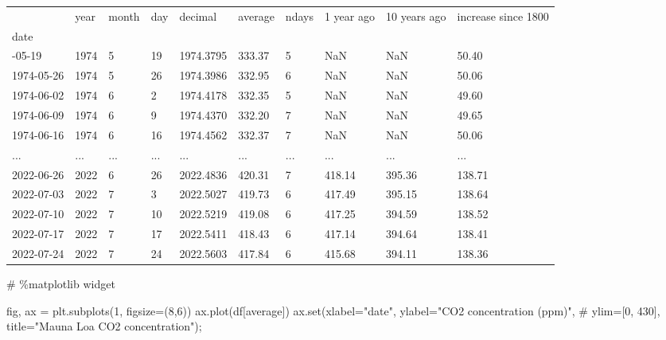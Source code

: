 \documentclass[
  letterpaper,
  DIV=11,
  numbers=noendperiod,
  oneside]{scrreprt}
\newenvironment{Shaded}{\begin{snugshade}}{\end{snugshade}}
\newcommand{\BuiltInTok}[1]{\textcolor[rgb]{0.00,0.23,0.31}{#1}}
\newcommand{\CommentTok}[1]{\textcolor[rgb]{0.37,0.37,0.37}{#1}}
\newcommand{\DecValTok}[1]{\textcolor[rgb]{0.68,0.00,0.00}{#1}}
\newcommand{\NormalTok}[1]{\textcolor[rgb]{0.00,0.23,0.31}{#1}}
\newcommand{\OperatorTok}[1]{\textcolor[rgb]{0.37,0.37,0.37}{#1}}
\newcommand{\StringTok}[1]{\textcolor[rgb]{0.13,0.47,0.30}{#1}}
\begin{document}
\begin{longtable}[]{@{}llllllllll@{}}
\toprule\noalign{}
& year & month & day & decimal & average & ndays & 1 year ago & 10 years
ago & increase since 1800 \\
date & & & & & & & & & \\
\midrule\noalign{}
\endhead
\bottomrule\noalign{}
\endlastfoot
1974-05-19 & 1974 & 5 & 19 & 1974.3795 & 333.37 & 5 & NaN & NaN &
50.40 \\
1974-05-26 & 1974 & 5 & 26 & 1974.3986 & 332.95 & 6 & NaN & NaN &
50.06 \\
1974-06-02 & 1974 & 6 & 2 & 1974.4178 & 332.35 & 5 & NaN & NaN &
49.60 \\
1974-06-09 & 1974 & 6 & 9 & 1974.4370 & 332.20 & 7 & NaN & NaN &
49.65 \\
1974-06-16 & 1974 & 6 & 16 & 1974.4562 & 332.37 & 7 & NaN & NaN &
50.06 \\
... & ... & ... & ... & ... & ... & ... & ... & ... & ... \\
2022-06-26 & 2022 & 6 & 26 & 2022.4836 & 420.31 & 7 & 418.14 & 395.36 &
138.71 \\
2022-07-03 & 2022 & 7 & 3 & 2022.5027 & 419.73 & 6 & 417.49 & 395.15 &
138.64 \\
2022-07-10 & 2022 & 7 & 10 & 2022.5219 & 419.08 & 6 & 417.25 & 394.59 &
138.52 \\
2022-07-17 & 2022 & 7 & 17 & 2022.5411 & 418.43 & 6 & 417.14 & 394.64 &
138.41 \\
2022-07-24 & 2022 & 7 & 24 & 2022.5603 & 417.84 & 6 & 415.68 & 394.11 &
138.36 \\
\end{longtable}

\begin{Shaded}
\begin{Highlighting}[]
\CommentTok{\# \%matplotlib widget}

\NormalTok{fig, ax }\OperatorTok{=}\NormalTok{ plt.subplots(}\DecValTok{1}\NormalTok{, figsize}\OperatorTok{=}\NormalTok{(}\DecValTok{8}\NormalTok{,}\DecValTok{6}\NormalTok{))}
\NormalTok{ax.plot(df[}\StringTok{\textquotesingle{}average\textquotesingle{}}\NormalTok{])}
\NormalTok{ax.}\BuiltInTok{set}\NormalTok{(xlabel}\OperatorTok{=}\StringTok{"date"}\NormalTok{,}
\NormalTok{       ylabel}\OperatorTok{=}\StringTok{"CO2 concentration (ppm)"}\NormalTok{,}
       \CommentTok{\# ylim=[0, 430],}
\NormalTok{       title}\OperatorTok{=}\StringTok{"Mauna Loa CO2 concentration"}\NormalTok{)}\OperatorTok{;}
\end{Highlighting}
\end{Shaded}
\end{document}
